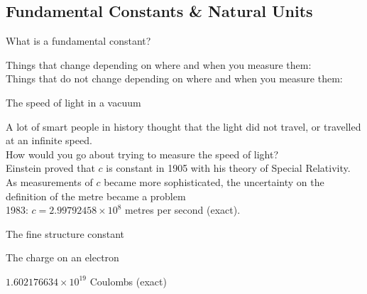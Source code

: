 \subsection{Fundamental Constants \& Natural Units}
\begin{frame}{What is a fundamental constant?}

Things that change depending on where and when you measure them:\\

Things that do not change depending on where and when you measure them:\\


\end{frame}



\begin{frame}{The speed of light in a vacuum}

A lot of smart people in history thought that the light did not travel, or travelled at an infinite speed.\\[2ex]

How would you go about trying to measure the speed of light?\\[5ex]

Einstein proved that $c$ is constant in 1905 with his theory of Special Relativity.\\[2ex]

As measurements of $c$ became more sophisticated, the uncertainty on the definition of the metre became a problem\\[1ex]


1983: $c = 2.99792458 \times 10^8$ metres per second (exact).\\

\end{frame}


\begin{frame}{The fine structure constant}



\end{frame}






\begin{frame}{The charge on an electron}

$1.602176634 \times 10^19$  Coulombs (exact) \\


\end{frame}


